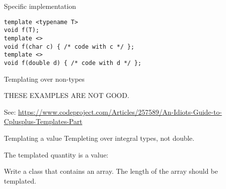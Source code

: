  {Specific implementation}

\begin{verbatim}
template <typename T>
void f(T);
template <> 
void f(char c) { /* code with c */ };
template <>
void f(double d) { /* code with d */ };
\end{verbatim}

 {Templating over non-types}

THESE EXAMPLES ARE NOT GOOD.

See:
\url{https://www.codeproject.com/Articles/257589/An-Idiots-Guide-to-Cplusplus-Templates-Part}

\begin{block}{Templating a value}
  Templeting over integral types, not double.

  The templated quantity is a value:
\end{block}

\begin{exercise}
  Write a class that contains an array. The length of the array should
  be templated.
\end{exercise}
